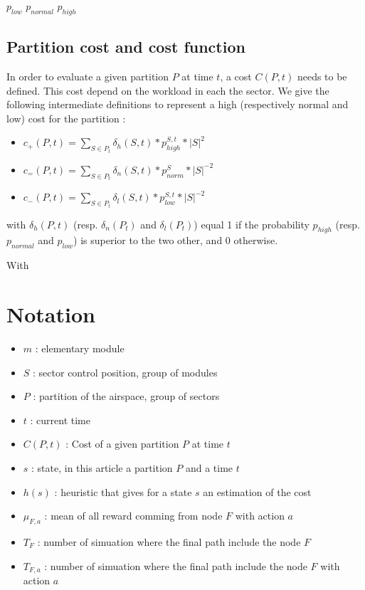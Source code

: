 \documentclass[twoside,twocolumn]{article}
\begin{document}
$p_{low}$
$p_{normal}$
$p_{high}$

\subsection{Partition cost and cost function}

In order to evaluate a given partition $P$ at time $t$, a cost $C(P, t)$ needs
to be defined. This cost depend on the workload in each the sector. We give the
following intermediate definitions to represent a high (respectively normal
and low) cost for the partition :
\begin{itemize}
    \item $c_+(P, t) = \sum_{S \in P_t} \delta_{h}(S, t) * p_{high}^{S, t} * |S|^2$
    \item $c_=(P, t) = \sum_{S \in P_t} \delta_{n}(S, t) * p_{norm}^{S} * |S|^{-2}$
    \item $c_-(P, t) = \sum_{S \in P_t} \delta_{l}(S, t) * p_{low}^{S, t} * |S|^{-2}$
\end{itemize}
with $\delta_{h}(P, t)$ (resp. $\delta_{n}(P_t)$ and $\delta_{l}(P_t)$) equal 1
if the probability $p_{high}$ (resp. $p_{normal}$ and $p_{low}$) is superior to
the two other, and 0 otherwise.

With

\section*{Notation}

\begin{itemize}
    \item $m$ : elementary module
    \item $S$ : sector control position, group of modules
    \item $P$ : partition of the airspace, group of sectors
    \item $t$ : current time
    \item $C(P, t)$ : Cost of a given partition $P$ at time $t$
    \item $s$ : state, in this article a partition $P$ and a time $t$
    \item $h(s)$ : heuristic that gives for a state $s$ an estimation of the cost
    \item $\mu_{F, a}$ : mean of all reward comming from node $F$ with action $a$
    \item $T_F$ : number of simuation where the final path include the node $F$
    \item $T_{F, a}$ : number of simuation where the final path include the node $F$ with action $a$
\end{itemize}




\end{document}
